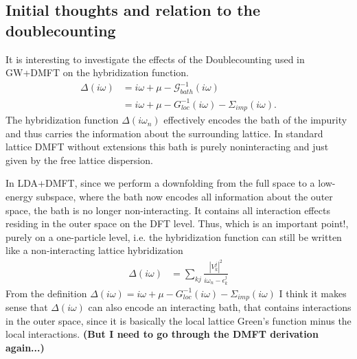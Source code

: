 \documentclass[12pt,a4paper]{scrartcl}
\numberwithin{equation}{section}
\begin{document}
\subsection{Initial thoughts and relation to the doublecounting}

It is interesting to investigate the effects of the Doublecounting
used in GW+DMFT on the hybridization function.
\begin{align}
\Delta(i\omega) &= i\omega + \mu - \mathscr{G}_{bath}^{-1}(i\omega) \\
&= i\omega + \mu - G_{loc}^{-1}(i\omega) - \Sigma_{imp}(i\omega).
\end{align}
The hybridization function $\Delta(i\omega_n)$ effectively encodes the bath
of the impurity and thus carries the information about the surrounding lattice.
In standard lattice DMFT without extensions this bath is purely noninteracting
and just given by the free lattice dispersion.

In LDA+DMFT, since we perform a downfolding from the full space
to a low-energy subspace, where the bath now encodes all information 
about the outer space, the bath is no longer non-interacting.
It contains all interaction effects residing in the outer space
on the DFT level. Thus, which is an important point!, purely
on a one-particle level, i.e. the hybridization function can still 
be written like a non-interacting lattice hybridization
\begin{align}
\Delta(i\omega) &= \sum_{kj} \frac{|V^j_k|^2}{i\omega_n - \epsilon_k^j}
\end{align}
From the definition 
$\Delta(i\omega) = i\omega + \mu - G_{loc}^{-1}(i\omega) - \Sigma_{imp}(i\omega)$
I think it makes sense that $\Delta(i\omega)$ can also encode an interacting
bath, that contains interactions in the outer space,
since it is basically the local lattice Green's function minus the local interactions.
\textbf{(But I need to go through
the DMFT derivation again...)}

\bigskip
\end{document}
